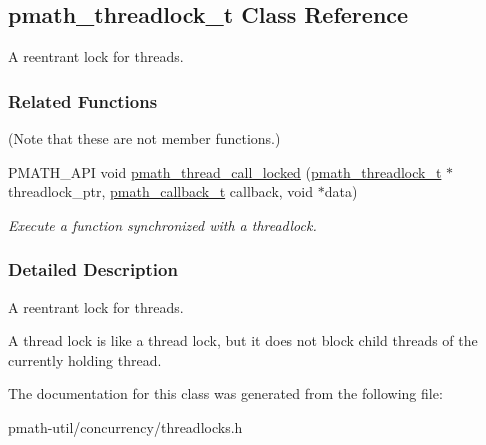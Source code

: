 \hypertarget{classpmath__threadlock__t}{
\subsection{pmath\_\-threadlock\_\-t Class Reference}
\label{classpmath__threadlock__t}
}
A reentrant lock for threads.  


\subsubsection*{Related Functions}
(Note that these are not member functions.) \begin{CompactItemize}
\item 
PMATH\_\-API void \hyperlink{group__threads_gfcbd1d376791cb95a78e102366b7b79a}{pmath\_\-thread\_\-call\_\-locked} (\hyperlink{classpmath__threadlock__t}{pmath\_\-threadlock\_\-t} $\ast$threadlock\_\-ptr, \hyperlink{group__general__types_ge1a454657f18f3cc54508adeccccbcbc}{pmath\_\-callback\_\-t} callback, void $\ast$data)
\begin{CompactList}\small\item\em Execute a function synchronized with a threadlock. \item\end{CompactList}\end{CompactItemize}


\subsubsection{Detailed Description}
A reentrant lock for threads. 

A thread lock is like a thread lock, but it does not block child threads of the currently holding thread. 

The documentation for this class was generated from the following file:\begin{CompactItemize}
\item 
pmath-util/concurrency/threadlocks.h\end{CompactItemize}
